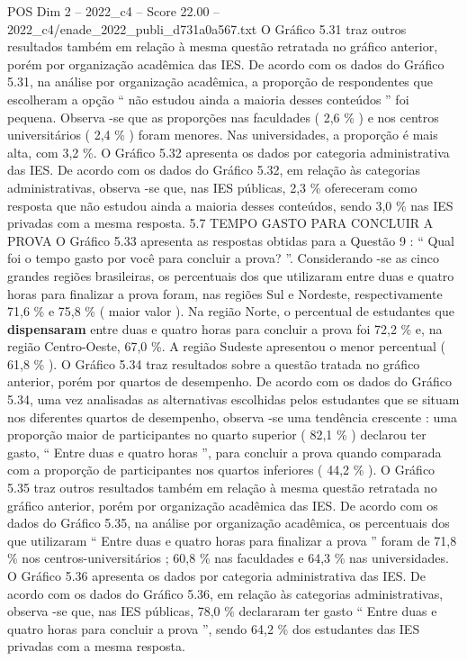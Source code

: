 \begin{textsample}{POS Dim 2 – 2022\_c4 – Score 22.00 – 2022\_c4/enade\_2022\_publi\_d731a0a567.txt}
O Gráfico 5.31 traz outros resultados também em relação à mesma questão retratada no gráfico anterior, porém por organização acadêmica das IES.
De acordo com os dados do Gráfico 5.31, na análise por organização acadêmica, a proporção de respondentes que escolheram a opção “ não estudou ainda a maioria desses conteúdos ” foi pequena.
Observa -se que as proporções nas faculdades ( 2,6 \% ) e nos centros universitários ( 2,4 \% ) foram menores.
Nas universidades, a proporção é mais alta, com 3,2 \%.
O Gráfico 5.32 apresenta os dados por categoria administrativa das IES.
De acordo com os dados do Gráfico 5.32, em relação às categorias administrativas, observa -se que, nas IES públicas, 2,3 \% ofereceram como resposta que não estudou ainda a maioria desses conteúdos, sendo 3,0 \% nas IES privadas com a mesma resposta. 5.7 TEMPO GASTO PARA CONCLUIR A PROVA O Gráfico 5.33 apresenta as respostas obtidas para a Questão 9 : “ Qual foi o tempo gasto por você para concluir a prova? ”.
Considerando -se as cinco grandes regiões brasileiras, os percentuais dos que utilizaram entre duas e quatro horas para finalizar a prova foram, nas regiões Sul e Nordeste, respectivamente 71,6 \% e 75,8 \% ( maior valor ).
Na região Norte, o percentual de estudantes que \textbf{dispensaram} entre duas e quatro horas para concluir a prova foi 72,2 \% e, na região Centro-Oeste, 67,0 \%.
A região Sudeste apresentou o menor percentual ( 61,8 \% ).
O Gráfico 5.34 traz resultados sobre a questão tratada no gráfico anterior, porém por quartos de desempenho.
De acordo com os dados do Gráfico 5.34, uma vez analisadas as alternativas escolhidas pelos estudantes que se situam nos diferentes quartos de desempenho, observa -se uma tendência crescente : uma proporção maior de participantes no quarto superior ( 82,1 \% ) declarou ter gasto, “ Entre duas e quatro horas ”, para concluir a prova quando comparada com a proporção de participantes nos quartos inferiores ( 44,2 \% ).
O Gráfico 5.35 traz outros resultados também em relação à mesma questão retratada no gráfico anterior, porém por organização acadêmica das IES.
De acordo com os dados do Gráfico 5.35, na análise por organização acadêmica, os percentuais dos que utilizaram “ Entre duas e quatro horas para finalizar a prova ” foram de 71,8 \% nos centros-universitários ; 60,8 \% nas faculdades e 64,3 \% nas universidades.
O Gráfico 5.36 apresenta os dados por categoria administrativa das IES.
De acordo com os dados do Gráfico 5.36, em relação às categorias administrativas, observa -se que, nas IES públicas, 78,0 \% declararam ter gasto “ Entre duas e quatro horas para concluir a prova ”, sendo 64,2 \% dos estudantes das IES privadas com a mesma resposta.

\end{textsample}

